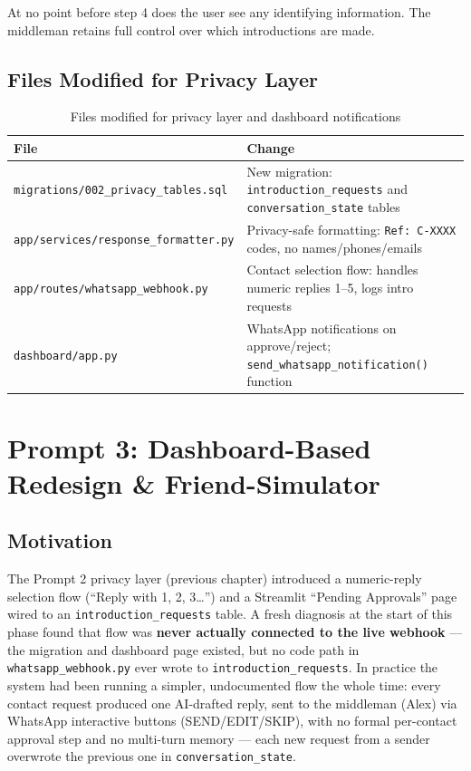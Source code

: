 \documentclass[12pt, a4paper]{report}
\begin{document}
At no point before step 4 does the user see any identifying information. The middleman retains full control over which introductions are made.

\section{Files Modified for Privacy Layer}

\begin{table}[H]
\centering
\begin{tabular}{p{5cm}p{8cm}}
\toprule
\textbf{File} & \textbf{Change} \\
\midrule
\texttt{migrations/002\_privacy\_tables.sql} & New migration: \texttt{introduction\_requests} and \texttt{conversation\_state} tables \\
\texttt{app/services/response\_formatter.py} & Privacy-safe formatting: \texttt{Ref: C-XXXX} codes, no names/phones/emails \\
\texttt{app/routes/whatsapp\_webhook.py} & Contact selection flow: handles numeric replies 1--5, logs intro requests \\
\texttt{dashboard/app.py} & WhatsApp notifications on approve/reject; \texttt{send\_whatsapp\_notification()} function \\
\bottomrule
\end{tabular}
\caption{Files modified for privacy layer and dashboard notifications}
\end{table}

\chapter{Prompt 3: Dashboard-Based Redesign \& Friend-Simulator}

\section{Motivation}

The Prompt 2 privacy layer (previous chapter) introduced a numeric-reply selection flow (``Reply with 1, 2, 3\ldots'') and a Streamlit ``Pending Approvals'' page wired to an \texttt{introduction\_requests} table. A fresh diagnosis at the start of this phase found that flow was \textbf{never actually connected to the live webhook} --- the migration and dashboard page existed, but no code path in \texttt{whatsapp\_webhook.py} ever wrote to \texttt{introduction\_requests}. In practice the system had been running a simpler, undocumented flow the whole time: every contact request produced one AI-drafted reply, sent to the middleman (Alex) via WhatsApp interactive buttons (SEND/EDIT/SKIP), with no formal per-contact approval step and no multi-turn memory --- each new request from a sender overwrote the previous one in \texttt{conversation\_state}.
\end{document}
